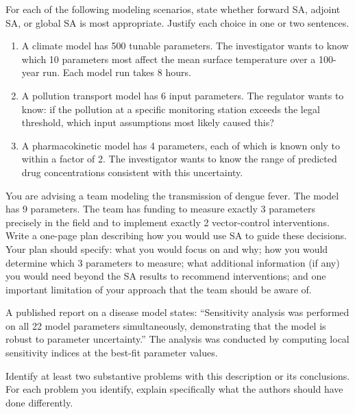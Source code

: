 \begin{exercise}[\bloom{L4}]
\label{ex:ch1:methodchoice}
For each of the following modeling scenarios, state whether forward SA,
adjoint SA, or global SA is most appropriate. Justify each choice in
one or two sentences.
\begin{enumerate}[label=(\alph*)]
  \item A climate model has 500 tunable parameters.
        The investigator wants to know which 10 parameters most
        affect the mean surface temperature over a 100-year run.
        Each model run takes 8 hours.
  \item A pollution transport model has 6 input parameters.
        The regulator wants to know: if the pollution at a specific
        monitoring station exceeds the legal threshold,
        which input assumptions most likely caused this?
  \item A pharmacokinetic model has 4 parameters, each of which
        is known only to within a factor of 2. The investigator
        wants to know the range of predicted drug concentrations
        consistent with this uncertainty.
\end{enumerate}
\end{exercise}

\begin{exercise}[\bloom{L5}]
\label{ex:ch1:studydesign}
You are advising a team modeling the transmission of dengue fever.
The model has 9 parameters.
The team has funding to measure exactly 3 parameters precisely in
the field and to implement exactly 2 vector-control interventions.
Write a one-page plan describing how you would use SA to guide
these decisions. Your plan should specify:
what \QOI you would focus on and why;
how you would determine which 3 parameters to measure;
what additional information (if any) you would need
beyond the SA results to recommend interventions;
and one important limitation of your approach
that the team should be aware of.
\end{exercise}

\begin{exercise}[\bloom{L6}]
\label{ex:ch1:evaluation}
A published report on a disease model states:
``Sensitivity analysis was performed on all 22 model parameters
simultaneously, demonstrating that the model is robust
to parameter uncertainty.'' The analysis was conducted by
computing local sensitivity indices at the best-fit parameter values.

Identify at least two substantive problems with this description
or its conclusions. For each problem you identify, explain
specifically what the authors should have done differently.
\end{exercise}


